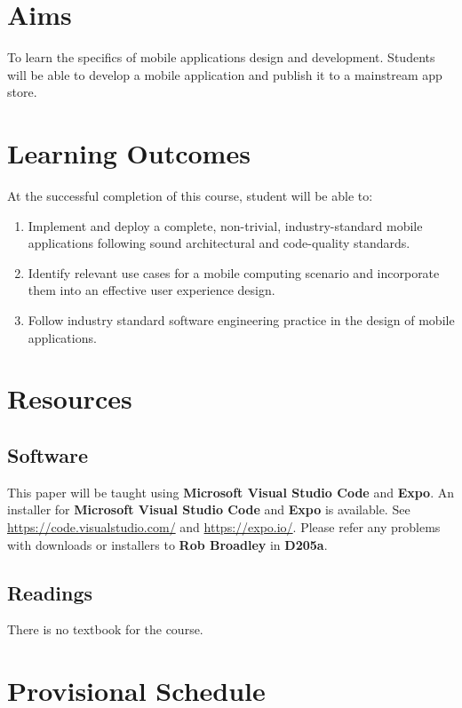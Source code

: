 \documentclass{article}
\begin{document}
\section*{Aims}
To learn the specifics of mobile applications design and development. Students will be able to develop a mobile application and publish it to a mainstream app store.

\section*{Learning Outcomes}
At the successful completion of this course, student will be able to:
\begin{enumerate}
  \item Implement and deploy a complete, non-trivial, industry-standard mobile applications following sound architectural and code-quality standards.
  \item Identify relevant use cases for a mobile computing scenario and incorporate them into an effective user experience design.
  \item Follow industry standard software engineering practice in the design of mobile applications.
\end{enumerate} 

\section*{Resources}

\subsection*{Software}
This paper will be taught using \textbf{Microsoft Visual Studio Code} and \textbf{Expo}. An installer for \textbf{Microsoft Visual Studio Code} and \textbf{Expo} is available. See \href{https://code.visualstudio.com/}{https://code.visualstudio.com/} and \href{https://expo.io/}{https://expo.io/}. Please refer any problems with downloads or installers to \textbf{Rob Broadley} in \textbf{D205a}.

\subsection*{Readings}
There is no textbook for the course.

\section*{Provisional Schedule}
\end{document}
